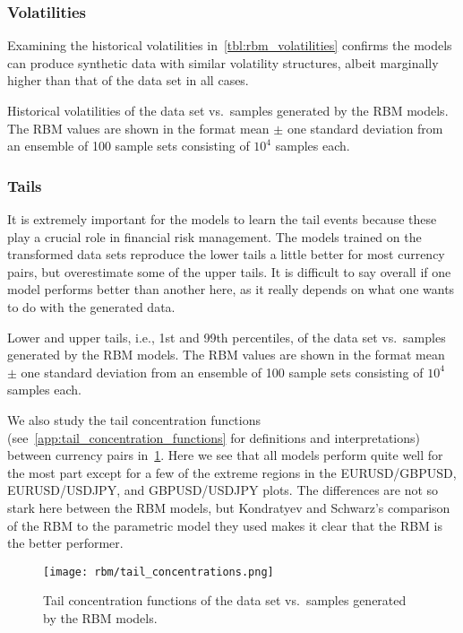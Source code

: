 \subsubsection{Volatilities}
Examining the historical volatilities in~\cref{tbl:rbm_volatilities} confirms the models can produce synthetic data with similar volatility structures, albeit marginally higher than that of the data set in all cases.
\begin{table}[!htb]
    \centering
    \begin{adjustbox}{max width=\textwidth}
        
    \end{adjustbox}
    \caption{Historical volatilities of the data set vs.~samples generated by the RBM models. The RBM values are shown in the format mean \(\pm\) one standard deviation from an ensemble of 100 sample sets consisting of \( 10^4 \) samples each.}
    \label{tbl:rbm_volatilities}
\end{table}

\subsubsection{Tails}
It is extremely important for the models to learn the tail events because these play a crucial role in financial risk management.
The models trained on the transformed data sets reproduce the lower tails a little better for most currency pairs, but overestimate some of the upper tails.
It is difficult to say overall if one model performs better than another here, as it really depends on what one wants to do with the generated data.
\begin{table}[!htb]
    \centering
    \begin{adjustbox}{max width=\textwidth}
        
    \end{adjustbox}
    \caption{Lower and upper tails, i.e., 1st and 99th percentiles, of the data set vs.~samples generated by the RBM models. The RBM values are shown in the format mean \(\pm\) one standard deviation from an ensemble of 100 sample sets consisting of \( 10^4 \) samples each.}
    \label{tbl:rbm_tails}
\end{table}

We also study the tail concentration functions (see~\cref{app:tail_concentration_functions} for definitions and interpretations) between currency pairs in~\cref{fig:rbm_tail_concentrations}.
Here we see that all models perform quite well for the most part except for a few of the extreme regions in the EURUSD/GBPUSD, EURUSD/USDJPY, and GBPUSD/USDJPY plots.
The differences are not so stark here between the RBM models, but Kondratyev and Schwarz's comparison of the RBM to the parametric model they used makes it clear that the RBM is the better performer.
\begin{figure}[!htb]
    \begin{center}
        \texttt{[image: rbm/tail\_concentrations.png]}
    \end{center}
    \caption{Tail concentration functions of the data set vs.~samples generated by the RBM models.}
    \label{fig:rbm_tail_concentrations}
\end{figure}

